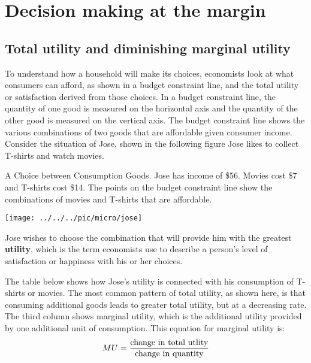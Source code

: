 
\pbn
\section{Decision making at the margin}


\subsection{Total utility and diminishing marginal utility}
To understand how a household will make its choices, economists look at what consumers can afford, as shown in a budget constraint line, and the total utility or satisfaction derived from those choices. In a budget constraint line, the quantity of one good is measured on the horizontal axis and the quantity of the other good is measured on the vertical axis. The budget constraint line shows the various combinations of two goods that are affordable given consumer income. Consider the situation of Jose, shown in the following figure Jose likes to collect T-shirts and watch movies.

A Choice between Consumption Goods. Jose has income of \$56. Movies cost \$7 and T-shirts cost \$14. The points on the budget constraint line show the combinations of movies and T-shirts that are affordable.

\begin{center}
	\texttt{[image: ../../../pic/micro/jose]}
\end{center}


\pbn
Jose wishes to choose the combination that will provide him with the greatest \textbf{utility}, which is the term economists use to describe a person's level of satisfaction or happiness with his or her choices.

The table below shows how Jose’s utility is connected with his consumption of T-shirts or movies. The most common pattern of total utility, as shown here, is that consuming additional goods leads to greater total utility, but at a decreasing rate. The third column shows marginal utility, which is the additional utility provided by one additional unit of consumption. This equation for marginal utility is:
\[
MU=\frac{\textnormal{change in total utlity}}{\textnormal{change in quantity}}
\]

